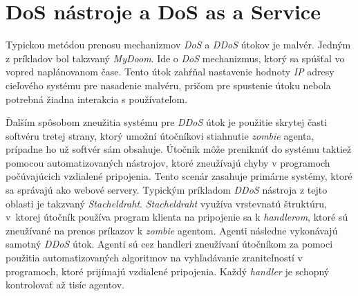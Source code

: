 \documentclass[
  digital, %
  table,   %
  lof,     %
  nolot,   %
  nocover
]{fithesis3}
\begin{document}


\section{DoS nástroje a DoS as a Service}
Typickou metódou prenosu mechanizmov \textit{DoS} a \textit{DDoS} útokov je malvér. Jedným z príkladov 
bol
takzvaný \textit{MyDoom}. Ide o \textit{DoS} mechanizmus, ktorý sa spúšťal vo vopred naplánovanom čase.
Tento útok zahŕňal nastavenie hodnoty \textit{IP} adresy cieľového systému pre nasadenie malvéru,
pričom pre spustenie útoku nebola potrebná žiadna interakcia s používateľom.

Ďalším spôsobom zneužitia systému pre \textit{DDoS} útok je použitie skrytej časti softvéru tretej
strany, ktorý umožní útočníkovi stiahnutie \textit{zombie} agenta, prípadne ho už softvér sám obsahuje.
Útočník môže preniknúť do systému taktiež pomocou automatizovaných nástrojov, ktoré zneužívajú chyby v
programoch počúvajúcich vzdialené pripojenia. Tento scenár zasahuje primárne systémy, ktoré sa správajú
ako webové servery. Typickým príkladom \textit{DDoS} nástroja z tejto oblasti je takzvaný
\textit{Stacheldraht}. \textit{Stacheldraht} využíva vrstevnatú štruktúru, v~ktorej útočník používa
program klienta na pripojenie sa k \textit{handlerom}, ktoré sú zneužívané na prenos príkazov
k \textit{zombie} agentom. Agenti následne vykonávajú samotný \textit{DDoS} útok. Agenti sú cez 
handleri
zneužívaní útočníkom za pomoci použitia automatizovaných algoritmov na vyhľadávanie zraniteľností v
programoch, ktoré prijímajú vzdialené pripojenia. Každý \textit{handler} je schopný kontrolovať až 
tisíc
agentov. 
\end{document}

